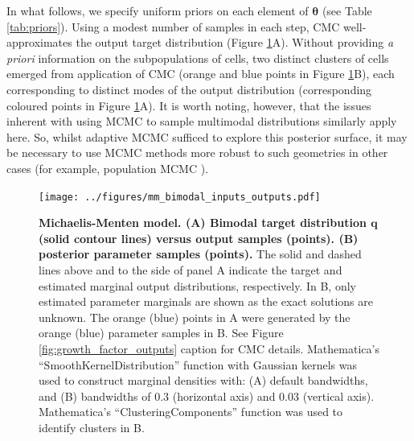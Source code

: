 %
In what follows, we specify uniform priors on each element of $\boldsymbol{\theta}$ (see Table \ref{tab:priors}). Using a modest number of samples in each step, CMC well-approximates the output target distribution (Figure \ref{fig:mm_bimodal_inputs_outputs}A). Without providing \textit{a priori} information on the subpopulations of cells, two distinct clusters of cells emerged from application of CMC (orange and blue points in Figure \ref{fig:mm_bimodal_inputs_outputs}B), each corresponding to distinct modes of the output distribution (corresponding coloured points in Figure \ref{fig:mm_bimodal_inputs_outputs}A). It is worth noting, however, that the issues inherent with using MCMC to sample multimodal distributions similarly apply here. So, whilst adaptive MCMC \cite{johnstone2016uncertainty} sufficed to explore this posterior surface, it may be necessary to use MCMC methods more robust to such geometries in other cases (for example, population MCMC \cite{jasra2007population}).

\begin{figure}[H]
\centerline{\texttt{[image: ../figures/mm\_bimodal\_inputs\_outputs.pdf]}}
\caption{\textbf{Michaelis-Menten model. (A) Bimodal target distribution $\boldsymbol{q}$ (solid contour lines) versus output samples (points). (B) posterior parameter samples (points).} The solid and dashed lines above and to the side of panel A indicate the target and estimated marginal output distributions, respectively. In B, only estimated parameter marginals are shown as the exact solutions are unknown. The orange (blue) points in A were generated by the orange (blue) parameter samples in B. See Figure \ref{fig:growth_factor_outputs} caption for CMC details. Mathematica's ``SmoothKernelDistribution'' function \cite{mathematica} with Gaussian kernels was used to construct marginal densities with: (A) default bandwidths, and (B) bandwidths of 0.3 (horizontal axis) and 0.03 (vertical axis). Mathematica's ``ClusteringComponents'' function \cite{mathematica} was used to identify clusters
in B.}
\label{fig:mm_bimodal_inputs_outputs}
\end{figure}

